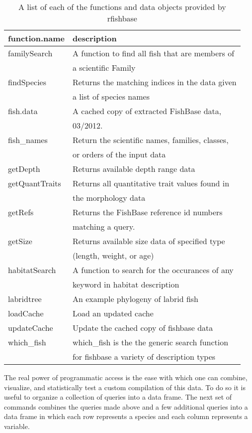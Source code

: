 \documentclass[author-year]{elsarticle} %
\begin{document}
\begin{table}[ht]
\begin{center}
\begin{tabular}{ll}
  \hline
function.name & description \\ 
  \hline
familySearch & A function to find all fish that are members of \\ 
   & a scientific Family \\ 
  findSpecies & Returns the matching indices in the data given \\ 
   & a list of species names \\ 
  fish.data & A cached copy of extracted FishBase data, \\ 
   & 03/2012. \\ 
  fish\_names & Return the scientific names, families, classes, \\ 
   & or orders of the input data \\ 
  getDepth & Returns available depth range data \\ 
  getQuantTraits & Returns all quantitative trait values found in \\ 
   & the morphology data \\ 
  getRefs & Returns the FishBase reference id numbers \\ 
   & matching a query. \\ 
  getSize & Returns available size data of specified type \\ 
   & (length, weight, or age) \\ 
  habitatSearch & A function to search for the occurances of any \\ 
   & keyword in habitat description \\ 
  labridtree & An example phylogeny of labrid fish \\ 
  loadCache & Load an updated cache \\ 
  updateCache & Update the cached copy of fishbase data \\ 
  which\_fish & which\_fish is the the generic search function \\ 
   & for fishbase a variety of description types \\ 
   \hline
\end{tabular}
\caption{A list of each of the functions and data objects provided by rfishbase}
\end{center}
\end{table}

The real power of programmatic access is the ease with which one can
combine, visualize, and statistically test a custom compilation of this
data. To do so it is useful to organize a collection of queries into a
data frame. The next set of commands combines the queries made above and
a few additional queries into a data frame in which each row represents
a species and each column represents a variable.
\end{document}
